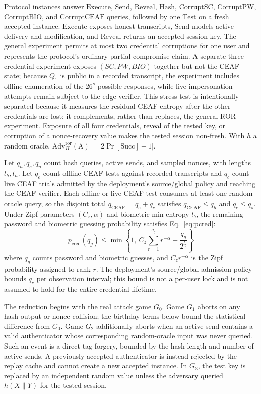 \documentclass[cmc,article,submit,moreauthors,pdftex]{Definitions/tsp}
\renewcommand{\mathsf}[1]{\mathrm{#1}}
\renewcommand{\mathcal}[1]{\mathrm{#1}}
\newcommand{\cc}{\mathbin{\|}}
\newcommand{\advA}{\mathcal{A}}
\begin{document}
Protocol instances answer $\mathsf{Execute}$, $\mathsf{Send}$, $\mathsf{Reveal}$, $\mathsf{Hash}$, $\mathsf{CorruptSC}$, $\mathsf{CorruptPW}$, $\mathsf{CorruptBIO}$, and $\mathsf{CorruptCEAF}$ queries, followed by one $\mathsf{Test}$ on a fresh accepted instance. $\mathsf{Execute}$ exposes honest transcripts, $\mathsf{Send}$ models active delivery and modification, and $\mathsf{Reveal}$ returns an accepted session key. The general experiment permits at most two credential corruptions for one user and represents the protocol's ordinary partial-compromise claim. A separate three-credential experiment exposes $(SC,PW,BIO)$ together but not the CEAF state; because $Q_1$ is public in a recorded transcript, the experiment includes offline enumeration of the $26^s$ possible responses, while live impersonation attempts remain subject to the edge verifier. This stress test is intentionally separated because it measures the residual CEAF entropy after the other credentials are lost; it complements, rather than replaces, the general ROR experiment. Exposure of all four credentials, reveal of the tested key, or corruption of a nonce-recovery value makes the tested session non-fresh. With $h$ a random oracle, $\mathsf{Adv}^{\mathrm{ror}}_\Pi(\advA)=|2\Pr[\mathsf{Succ}]-1|$.

Let $q_h,q_s,q_n$ count hash queries, active sends, and sampled nonces, with lengths $l_h,l_n$. Let $q_e$ count offline CEAF tests against recorded transcripts and $q_c$ count live CEAF trials admitted by the deployment's source/global policy and reaching the CEAF verifier. Each offline or live CEAF test consumes at least one random-oracle query, so the disjoint total $q_{\mathrm{CEAF}}=q_e+q_c$ satisfies $q_{\mathrm{CEAF}}\le q_h$ and $q_c\le q_s$. Under Zipf parameters $(C_z,\alpha)$ \cite{wangzipf} and biometric min-entropy $l_b$, the remaining password and biometric guessing probability satisfies Eq.~\eqref{eq:pcred}:
\begin{equation}
p_{\mathrm{cred}}(q_g)\le
 \min\left\{1,\ C_z\sum_{r=1}^{q_g}r^{-\alpha}+\frac{q_g}{2^{l_b}}\right\}
\label{eq:pcred}
\end{equation}
where $q_g$ counts password and biometric guesses, and $C_z r^{-\alpha}$ is the Zipf probability assigned to rank $r$. The deployment's source/global admission policy bounds $q_c$ per observation interval; this bound is not a per-user lock and is not assumed to hold for the entire credential lifetime.

The reduction begins with the real attack game $G_0$. Game $G_1$ aborts on any hash-output or nonce collision; the birthday terms below bound the statistical difference from $G_0$. Game $G_2$ additionally aborts when an active send contains a valid authenticator whose corresponding random-oracle input was never queried. Such an event is a direct tag forgery, bounded by the hash length and number of active sends. A previously accepted authenticator is instead rejected by the replay cache and cannot create a new accepted instance. In $G_3$, the test key is replaced by an independent random value unless the adversary queried $h(X\cc Y)$ for the tested session.
\end{document}
